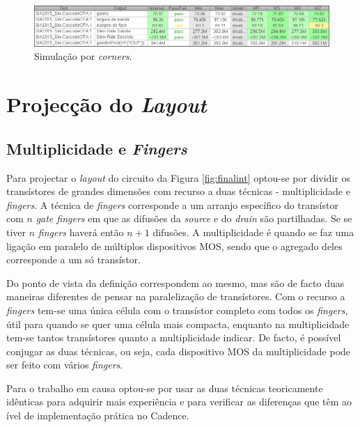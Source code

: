 \documentclass[11pt]{article}
\numberwithin{equation}{section}
\begin{document}
\begin{figure}[H]
	\centering
	\includegraphics[keepaspectratio=true, scale=0.65]{exps/Corners_Novo_semDiv}
	\vspace{-0.5em}
	\caption{Simulação por \textit{corners}.}
	\vspace{-0.8em}
\end{figure} 


\section{Projecção do \textit{Layout}}

\subsection{Multiplicidade e \textit{Fingers}}

Para projectar o \textit{layout} do circuito da Figura \ref{fig:finalint} optou-se por dividir os transístores de grandes dimensões com recurso a duas técnicas - multiplicidade e \textit{fingers}. A técnica de \textit{fingers} corresponde a um arranjo específico do transístor com $n$ \textit{gate fingers} em que as difusões da \textit{source} e do \textit{drain} são partilhadas. Se se tiver $n$ \textit{fingers} haverá então $n+1$ difusões. A multiplicidade é quando se faz uma ligação em paralelo de múltiplos dispositivos MOS, sendo que o agregado deles corresponde a um só transístor. 

Do ponto de vista da definição correspondem ao mesmo, mas são de facto duas maneiras diferentes de pensar na paralelização de transístores. Com o recurso a \textit{fingers} tem-se uma única célula com o transístor completo com todos os \textit{fingers}, útil para quando se quer uma célula mais compacta, enquanto na multiplicidade tem-se tantos transístores quanto a multiplicidade indicar. De facto, é possível conjugar as duas técnicas, ou seja, cada dispositivo MOS da multiplicidade pode ser feito com vários \textit{fingers}.

Para o trabalho em causa optou-se por usar as duas técnicas teoricamente idênticas para adquirir mais experiência e para verificar as diferenças que têm ao ível de implementação prática no Cadence.
\end{document}
